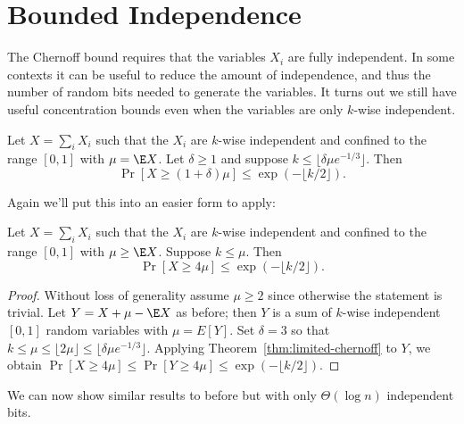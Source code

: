 \documentclass[11pt,a4paper]{article}
\begin{document}
\section{Bounded Independence}

The Chernoff bound requires that the variables \(X_i\) are fully independent.
In some contexts it can be useful to reduce the amount of independence, and thus the number of random bits needed to generate the variables.
It turns out we still have useful concentration bounds even when the variables are only \(k\)-wise independent.

\begin{theorem}
  \label{thm:limited-chernoff}
  Let \(X = \sum_i X_i\) such that the \(X_i\) are \(k\)-wise independent and confined to the range \([0, 1]\) with \(\mu = \E X\).
  Let \(\delta \ge 1\) and suppose \(k \le \lfloor \delta \mu e^{-1/3} \rfloor.\)
  Then \[\Pr[X \ge (1 + \delta)\mu] \le \exp(-\lfloor k/2 \rfloor).\]
\end{theorem}

Again we'll put this into an easier form to apply:

\begin{tcolorbox}
  \begin{corollary}
    \label{cor:limited-chernoff-simple}
    Let \(X = \sum_i X_i\) such that the \(X_i\) are \(k\)-wise independent and confined to the range \([0, 1]\) with \(\mu \ge \E X\).
    Suppose \(k \le \mu.\)
    Then \[\Pr[X \ge 4\mu] \le \exp(-\lfloor k/2 \rfloor).\]
  \end{corollary}
\end{tcolorbox}
\begin{proof}
  Without loss of generality assume \(\mu \ge 2\) since otherwise the statement is trivial.
  Let \(Y = X + \mu - \E X\) as before; then \(Y\) is a sum of \(k\)-wise independent \([0, 1]\) random variables with \(\mu = E[Y]\).
  Set \(\delta = 3\) so that \(k \le \mu \le \lfloor 2\mu \rfloor \le \lfloor \delta \mu e^{-1/3} \rfloor\).
  Applying Theorem~\ref{thm:limited-chernoff} to \(Y\), we obtain
  \(\Pr[X \ge 4\mu] \le \Pr[Y \ge 4\mu] \le \exp(-\lfloor k/2 \rfloor).\)
\end{proof}

We can now show similar results to before but with only \(\Theta(\log n)\) independent bits.
\end{document}
